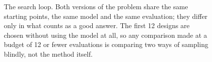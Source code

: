 \begin{figure}[t]
\caption{The search loop. Both versions of the problem share the same
starting points, the same model and the same evaluation; they differ only
in what counts as a good answer. The first 12 designs are chosen without
using the model at all, so any comparison made at a budget of 12 or fewer
evaluations is comparing two ways of sampling blindly, not the method
itself.}
\label{fig:boloop}
\end{figure}
